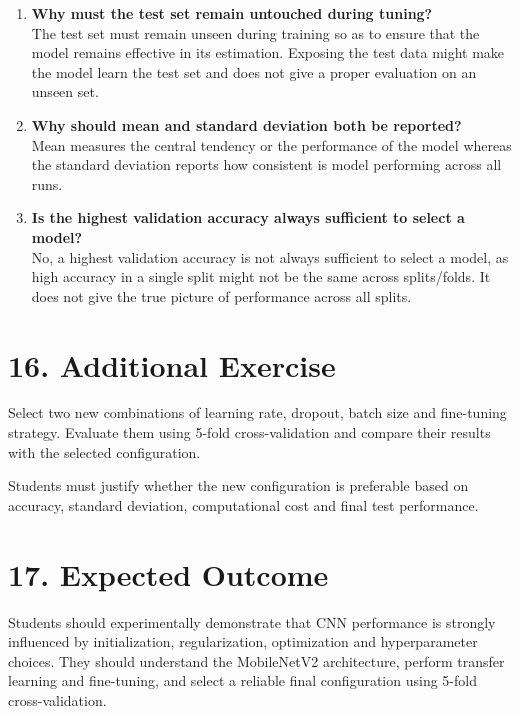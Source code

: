 \documentclass[10pt]{article}
\begin{document}
\begin{enumerate}
\item \textbf{Why must the test set remain untouched during tuning?}\\
The test set must remain unseen during training so as to ensure that the model remains effective in its estimation. Exposing the test data might make the model learn the test set and does not give a proper evaluation on an unseen set.

\item \textbf{Why should mean and standard deviation both be reported?}\\
Mean measures the central tendency or the performance of the model whereas the standard deviation reports how consistent is model performing across all runs.

\item \textbf{Is the highest validation accuracy always sufficient to select a model?}\\
No, a highest validation accuracy is not always sufficient to select a model, as high accuracy in a single split might not be the same across splits/folds. It does not give the true picture of performance across all splits.
\end{enumerate}

\section*{16. Additional Exercise}

Select two new combinations of learning rate, dropout, batch size and
fine-tuning strategy. Evaluate them using 5-fold cross-validation and
compare their results with the selected configuration.

Students must justify whether the new configuration is preferable based
on accuracy, standard deviation, computational cost and final test
performance.

\section*{17. Expected Outcome}

Students should experimentally demonstrate that CNN performance is
strongly influenced by initialization, regularization, optimization and
hyperparameter choices. They should understand the MobileNetV2 architecture,
perform transfer learning and fine-tuning, and select a reliable final
configuration using 5-fold cross-validation.
\end{document}
